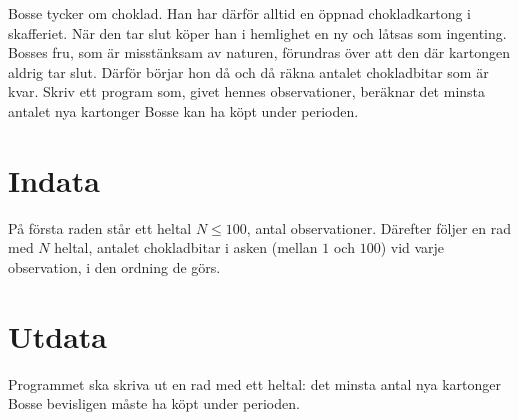Bosse tycker om choklad.
Han har därför alltid en öppnad chokladkartong i skafferiet.
När den tar slut köper han i hemlighet en ny och låtsas som ingenting.
Bosses fru, som är misstänksam av naturen, förundras över att den där kartongen aldrig tar slut.
Därför börjar hon då och då räkna antalet chokladbitar som är kvar.
Skriv ett program som, givet hennes observationer, beräknar det minsta antalet nya kartonger Bosse kan ha köpt under perioden.

\section*{Indata}
På första raden står ett heltal $N \le 100$, antal observationer.
Därefter följer en rad med $N$ heltal, antalet chokladbitar i asken (mellan $1$ och $100$) vid varje observation, i den ordning de görs.

\section*{Utdata}
Programmet ska skriva ut en rad med ett heltal: det minsta antal nya kartonger Bosse bevisligen måste ha köpt under perioden.
